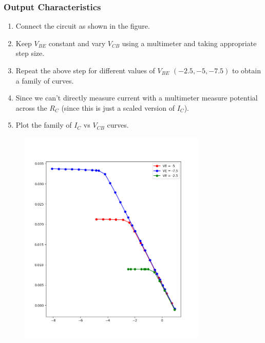 \documentclass[12pt,a4paper]{article}
\begin{document}
\subsubsection{Output Characteristics}
\begin{enumerate}
    \item Connect the circuit as shown in the figure. 
    \item Keep $V_{BE}$ constant and vary $V_{CB}$ using a multimeter and taking appropriate step size.
    \item Repeat the above step for different values of $V_{BE}$ $(-2.5, -5, -7.5)$ to obtain a family of curves.
    \item Since we can't directly measure current with a multimeter measure potential across the $R_C$ (since this is just a scaled version of $I_C$).
    \item Plot the family of $I_C$ vs $V_{CB}$ curves.
\end{enumerate}
\begin{figure}[H]
    \centering
    \includegraphics[width=0.8\textwidth]{Experiment_6/figs/cb_op.png}
\end{figure}
\end{document}
